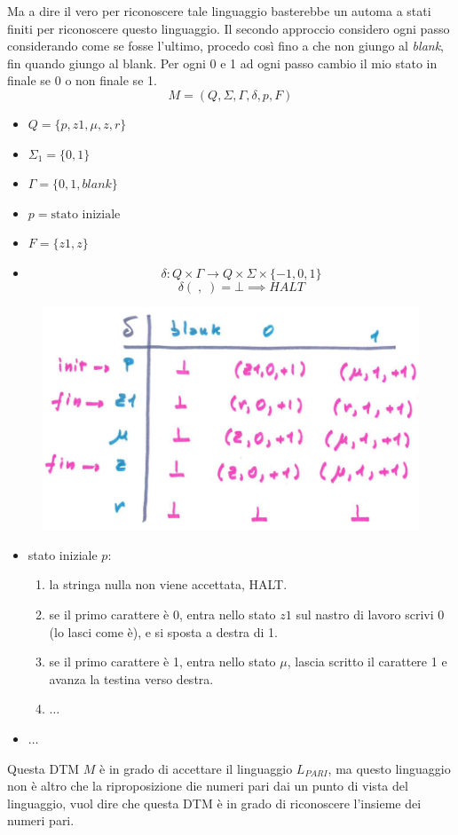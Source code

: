 \documentclass{article}
\begin{document}
Ma a dire il vero per riconoscere tale linguaggio basterebbe un automa a stati
finiti per riconoscere questo linguaggio. Il secondo approccio considero
ogni passo considerando come se fosse l'ultimo, procedo così fino a che non
giungo al \textit{blank}, fin quando giungo al blank. Per ogni 0 e 1 ad ogni
passo cambio il mio stato in finale se 0 o non finale se 1.
$$M=(Q,\Sigma,\Gamma,\delta,p,F)$$
\begin{itemize}
    \item $Q=\{p,z1,\mu,z,r\}$
    \item $\Sigma_1=\{0,1\}$
    \item $\Gamma=\{0,1,blank\}$
    \item $p=\text{stato iniziale}$
    \item $F=\{z1,z\}$
    \item $$\delta:Q\times\Gamma\rightarrow Q\times\Sigma\times\{-1,0,1\}$$
          $$\delta(\;,\;)=\bot\implies HALT$$
\end{itemize}

\begin{figure}[H]
    \centering
    \includegraphics[scale=0.6]{images/dtm_lpari.png}
\end{figure}

\begin{itemize}
    \item stato iniziale $p$:
          \begin{enumerate}
              \item la stringa nulla non viene accettata, HALT.
              \item se il primo carattere è 0, entra nello stato $z1$ sul
                    nastro di lavoro scrivi 0 (lo lasci come è), e si sposta a destra di 1.
              \item se il primo carattere è 1, entra nello stato $\mu$, lascia scritto
                    il carattere 1 e avanza la testina verso destra.
              \item $\dots$
          \end{enumerate}
    \item $\dots$
\end{itemize}
Questa DTM $M$ è in grado di accettare il linguaggio $L_{PARI}$, ma questo linguaggio
non è altro che la riproposizione die numeri pari dai un punto di
vista del linguaggio, vuol dire che questa DTM è in grado di riconoscere l'insieme
dei numeri pari.
\end{document}
